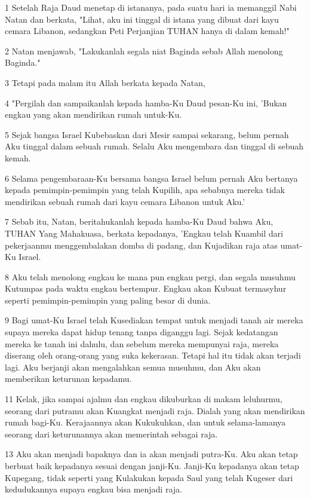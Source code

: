 \par 1 Setelah Raja Daud menetap di istananya, pada suatu hari ia memanggil Nabi Natan dan berkata, "Lihat, aku ini tinggal di istana yang dibuat dari kayu cemara Libanon, sedangkan Peti Perjanjian TUHAN hanya di dalam kemah!"
\par 2 Natan menjawab, "Lakukanlah segala niat Baginda sebab Allah menolong Baginda."
\par 3 Tetapi pada malam itu Allah berkata kepada Natan,
\par 4 "Pergilah dan sampaikanlah kepada hamba-Ku Daud pesan-Ku ini, 'Bukan engkau yang akan mendirikan rumah untuk-Ku.
\par 5 Sejak bangsa Israel Kubebaskan dari Mesir sampai sekarang, belum pernah Aku tinggal dalam sebuah rumah. Selalu Aku mengembara dan tinggal di sebuah kemah.
\par 6 Selama pengembaraan-Ku bersama bangsa Israel belum pernah Aku bertanya kepada pemimpin-pemimpin yang telah Kupilih, apa sebabnya mereka tidak mendirikan sebuah rumah dari kayu cemara Libanon untuk Aku.'
\par 7 Sebab itu, Natan, beritahukanlah kepada hamba-Ku Daud bahwa Aku, TUHAN Yang Mahakuasa, berkata kepadanya, 'Engkau telah Kuambil dari pekerjaanmu menggembalakan domba di padang, dan Kujadikan raja atas umat-Ku Israel.
\par 8 Aku telah menolong engkau ke mana pun engkau pergi, dan segala musuhmu Kutumpas pada waktu engkau bertempur. Engkau akan Kubuat termasyhur seperti pemimpin-pemimpin yang paling besar di dunia.
\par 9 Bagi umat-Ku Israel telah Kusediakan tempat untuk menjadi tanah air mereka supaya mereka dapat hidup tenang tanpa diganggu lagi. Sejak kedatangan mereka ke tanah ini dahulu, dan sebelum mereka mempunyai raja, mereka diserang oleh orang-orang yang suka kekerasan. Tetapi hal itu tidak akan terjadi lagi. Aku berjanji akan mengalahkan semua musuhmu, dan Aku akan memberikan keturunan kepadamu.
\par 11 Kelak, jika sampai ajalmu dan engkau dikuburkan di makam leluhurmu, seorang dari putramu akan Kuangkat menjadi raja. Dialah yang akan mendirikan rumah bagi-Ku. Kerajaannya akan Kukukuhkan, dan untuk selama-lamanya seorang dari keturunannya akan memerintah sebagai raja.
\par 13 Aku akan menjadi bapaknya dan ia akan menjadi putra-Ku. Aku akan tetap berbuat baik kepadanya sesuai dengan janji-Ku. Janji-Ku kepadanya akan tetap Kupegang, tidak seperti yang Kulakukan kepada Saul yang telah Kugeser dari kedudukannya supaya engkau bisa menjadi raja.
